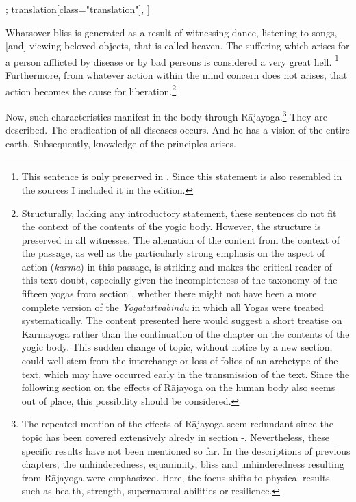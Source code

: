 \begin{alignment}[
  texts=edition[class="edition"];
  translation[class="translation"],
  ]
\begin{translation}
\begin{tlate}[p41_03]
Whatsover bliss is generated as a result of witnessing dance, listening to songs, [and] viewing beloved objects, that is called heaven. The suffering which arises for a person afflicted by disease or by bad persons is considered a very great hell. \footnote{This sentence is only preserved in . Since this statement is also resembled in the sources I included it in the edition.} Furthermore, from whatever action within the mind concern does not arises, that action becomes the cause for liberation.\footnote{Structurally, lacking any introductory statement, these sentences do not fit the context of the contents of the yogic body. However, the structure is preserved in all witnesses. The alienation of the content from the context of the passage, as well as the particularly strong emphasis on the aspect of action (\textit{karma}) in this passage, is striking and makes the critical reader of this text doubt, especially given the incompleteness of the taxonomy of the fifteen yogas from section , whether there might not have been a more complete version of the \textit{Yogatattvabindu} in which all Yogas were treated systematically. The content presented here would suggest a short treatise on Karmayoga rather than the continuation of the chapter on the contents of the yogic body. This sudden change of topic, without notice by a new section, could well stem from the interchange or loss of folios of an archetype of the text, which may have occurred early in the transmission of the text. Since the following section on the effects of Rājayoga on the human body also seems out of place, this possibility should be considered.} 
\end{tlate}
\label{attributesrajabody}
    \begin{tlate}[p42_01]
    \bigskip
Now, such characteristics manifest in the body through Rājayoga.\footnote{The repeated mention of the effects of Rājayoga seem redundant since the topic has been covered extensively alredy in section -. Nevertheless, these specific results have not been mentioned so far. In the descriptions of previous chapters, the unhinderedness, equanimity, bliss and unhinderedness resulting from Rājayoga were emphasized. Here, the focus shifts to physical results such as health, strength, supernatural abilities or resilience.} They are described. The eradication of all diseases occurs. And he has a vision of the entire earth. Subsequently, knowledge of the principles arises. 

\end{tlate}
\end{translation}
\end{alignment}
